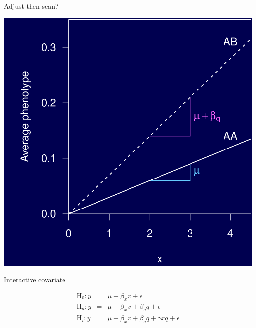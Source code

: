 \documentclass[12pt]{article}
\newcommand{\headsize}{\fontsize{35}{35} \selectfont}
\newcommand{\smallsize}{\fontsize{25}{30} \selectfont}
\begin{document}
\newpage

\headsize \color{myyellow}
\hfill \begin{minipage}{5.75in}
\centering
Adjust then scan?
\end{minipage}

\vfill

\centerline{\includegraphics{Figs/y_over_x.pdf}}




\newpage

\headsize \color{myyellow}
\hfill \begin{minipage}{5.75in}
\centering
Interactive covariate
\end{minipage}

\vspace{15mm}

\color{mywhite} \smallsize

\begin{eqnarray*}
\text{H}_0: y & = & \mu + \beta_x x + \epsilon \\
\text{H}_a: y & = & \mu + \beta_x x + \beta_q q + \epsilon \\
\text{H}_i: y & = & \mu + \beta_x x + \beta_q q + \gamma x q + \epsilon
\end{eqnarray*}

\vspace{15mm}
\end{document}
